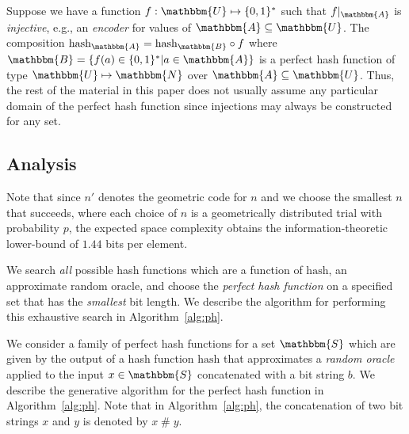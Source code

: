 \documentclass[hidelinks,11pt,final]{article}
\theoremstyle{plain}
\newcommand{\cat}{\mathbin{\#}}
\begin{document}
Suppose we have a function $f : \mathbbm{U} \mapsto \{0,1\}^*$ such that $f|_{\mathbbm{A}}$ is \emph{injective}, e.g., an \emph{encoder} for values of $\mathbbm{A} \subseteq \mathbbm{U}$.
The composition $\mathrm{hash}_{\mathbbm{A}} = \mathrm{hash}_{\mathbbm{B}} \circ f$ where $\mathbbm{B} = \{f(a) \in \{0,1\}^*|a \in \mathbbm{A}\}$ is a perfect hash function of type $\mathbbm{U} \mapsto \mathbbm{N}$ over $\mathbbm{A} \subseteq \mathbbm{U}$.
Thus, the rest of the material in this paper does not usually assume any particular domain of the perfect hash function since injections may always be constructed for any set.

\subsection{Analysis}
Note that since $n'$ denotes the geometric code for $n$ and we choose the smallest $n$ that succeeds, where each choice of $n$ is a geometrically distributed trial with probability $p$, the expected space complexity obtains the information-theoretic lower-bound of $1.44$ bits per element.


We search \emph{all} possible hash functions which are a function of $\mathrm{hash}$, an approximate random oracle, and choose the \emph{perfect hash function} on a specified set that has the \emph{smallest} bit length. We describe the algorithm for performing this exhaustive search in Algorithm~\ref{alg:ph}.


We consider a family of perfect hash functions for a set $\mathbbm{S}$ which are given by the output of a hash function $\mathrm{hash}$ that approximates a \emph{random oracle} applied to the input $x \in \mathbbm{S}$ concatenated with a bit string $b$. We describe the generative algorithm for the perfect hash function in Algorithm~\ref{alg:ph}. Note that in Algorithm~\ref{alg:ph}, the concatenation of two bit strings $x$ and $y$ is denoted by $x \cat y$.
\end{document}

